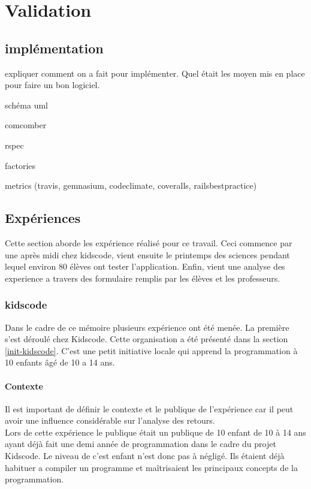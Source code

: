 \chapter{Validation}
\section{implémentation}
expliquer comment on a fait pour implémenter. Quel était les moyen mis en place pour faire un bon logiciel.

schéma uml

comcomber

rspec

factories

metrics (travis, gemnasium, codeclimate, coveralls, railsbestpractice)

\section{Expériences}
Cette section aborde les expérience réalisé pour ce travail. Ceci commence par une après midi chez kidscode, vient ensuite le printemps des sciences pendant lequel environ 80 élèves ont tester l'application. Enfin, vient une analyse des experience a travers des formulaire remplis par les élèves et les professeurs. %
\subsection{kidscode}
\label{kidscode}
Dans le cadre de ce mémoire plusieurs expérience ont été menée. La première s'est déroulé chez Kidscode. Cette organisation a été présenté dans la section \ref{init-kidscode}. C'est une petit initiative locale qui apprend la programmation à 10 enfants âgé de 10 a 14 ans.

\subsubsection{Contexte}
\label{context-kidscode}
Il est important de définir le contexte et le publique de l'expérience car il peut avoir une influence considérable sur l'analyse des retours.\\

Lors de cette expérience le publique était un publique de 10 enfant de 10 à 14 ans ayant déjà fait une demi année de programmation dans le cadre du projet Kidscode. Le niveau de c'est enfant n'est donc pas à négligé. Ils étaient déjà habituer a compiler un programme et maîtrisaient les principaux concepts de la programmation.\\


